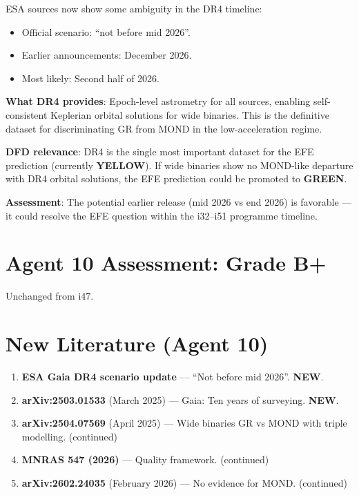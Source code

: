 \documentclass[11pt,a4paper]{article}
\newcommand{\GREEN}{\textcolor{dfdgreen}{\textbf{GREEN}}}
\newcommand{\YELLOW}{\textcolor{dfdyellow}{\textbf{YELLOW}}}
\newcommand{\NEW}{\textcolor{dfdblue}{\textbf{NEW}}}
\begin{document}
\begin{tcolorbox}[colback=blue!5!white, colframe=blue!60!black,
  title={\NEW: Gaia DR4 Timeline: ``Not Before Mid 2026'' vs ``December 2026''}]

ESA sources now show some ambiguity in the DR4 timeline:
\begin{itemize}
\item Official scenario: ``not before mid 2026''.
\item Earlier announcements: December 2026.
\item Most likely: Second half of 2026.
\end{itemize}

\textbf{What DR4 provides}: Epoch-level astrometry for all sources, enabling self-consistent Keplerian orbital solutions for wide binaries. This is the definitive dataset for discriminating GR from MOND in the low-acceleration regime.

\textbf{DFD relevance}: DR4 is the single most important dataset for the EFE prediction (currently \YELLOW). If wide binaries show no MOND-like departure with DR4 orbital solutions, the EFE prediction could be promoted to \GREEN.

\textbf{Assessment}: The potential earlier release (mid 2026 vs end 2026) is favorable --- it could resolve the EFE question within the i32--i51 programme timeline.
\end{tcolorbox}

\section{Agent 10 Assessment: Grade B+}

Unchanged from i47.

\section{New Literature (Agent 10)}

\begin{enumerate}
\item \textbf{ESA Gaia DR4 scenario update} --- ``Not before mid 2026''. \NEW.
\item \textbf{arXiv:2503.01533} (March 2025) --- Gaia: Ten years of surveying. \NEW.
\item \textbf{arXiv:2504.07569} (April 2025) --- Wide binaries GR vs MOND with triple modelling. (continued)
\item \textbf{MNRAS 547 (2026)} --- Quality framework. (continued)
\item \textbf{arXiv:2602.24035} (February 2026) --- No evidence for MOND. (continued)
\end{enumerate}
\end{document}
